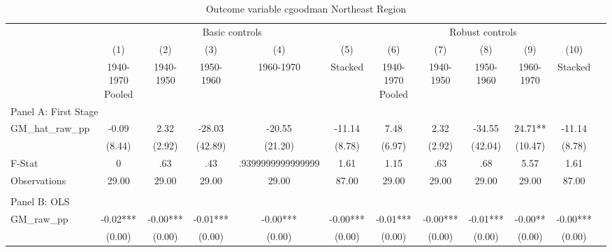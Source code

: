  \begin{table}[htbp]\centering {} \begin{threeparttable} \caption{Outcome variable cgoodman Northeast Region} \begin{tabular}{l*{11}{c}} \toprule
          &\multicolumn{5}{c}{Basic controls}                                   &\multicolumn{5}{c}{Robust controls}                                  \\\cmidrule(lr){2-6}\cmidrule(lr){7-11}
          &\multicolumn{1}{c}{(1)}&\multicolumn{1}{c}{(2)}&\multicolumn{1}{c}{(3)}&\multicolumn{1}{c}{(4)}&\multicolumn{1}{c}{(5)}&\multicolumn{1}{c}{(6)}&\multicolumn{1}{c}{(7)}&\multicolumn{1}{c}{(8)}&\multicolumn{1}{c}{(9)}&\multicolumn{1}{c}{(10)}\\
          &\multicolumn{1}{c}{1940-1970 Pooled}&\multicolumn{1}{c}{1940-1950}&\multicolumn{1}{c}{1950-1960}&\multicolumn{1}{c}{1960-1970}&\multicolumn{1}{c}{Stacked}&\multicolumn{1}{c}{1940-1970 Pooled}&\multicolumn{1}{c}{1940-1950}&\multicolumn{1}{c}{1950-1960}&\multicolumn{1}{c}{1960-1970}&\multicolumn{1}{c}{Stacked}\\
\cmidrule(lr){1-11}
\multicolumn{10}{l}{Panel A: First Stage}\\
\cmidrule(lr){1-11}
GM\_hat\_raw\_pp&     -0.09   &      2.32   &    -28.03   &    -20.55   &    -11.14   &      7.48   &      2.32   &    -34.55   &     24.71** &    -11.14   \\
          &    (8.44)   &    (2.92)   &   (42.89)   &   (21.20)   &    (8.78)   &    (6.97)   &    (2.92)   &   (42.04)   &   (10.47)   &    (8.78)   \\
\midrule
F-Stat    &         0   &       .63   &       .43   &.9399999999999999   &      1.61   &      1.15   &       .63   &       .68   &      5.57   &      1.61   \\
Observations&     29.00   &     29.00   &     29.00   &     29.00   &     87.00   &     29.00   &     29.00   &     29.00   &     29.00   &     87.00   \\
\cmidrule[\heavyrulewidth](lr){1-11} \\ \cmidrule[\heavyrulewidth](lr){1-11}
\multicolumn{10}{l}{Panel B: OLS}\\
\cmidrule(lr){1-11}
GM\_raw\_pp &     -0.02***&     -0.00***&     -0.01***&     -0.00***&     -0.00***&     -0.01***&     -0.00***&     -0.01***&     -0.00** &     -0.00***\\
          &    (0.00)   &    (0.00)   &    (0.00)   &    (0.00)   &    (0.00)   &    (0.00)   &    (0.00)   &    (0.00)   &    (0.00)   &    (0.00)   \\

\end{tabular}
\end{threeparttable}
\end{table}

